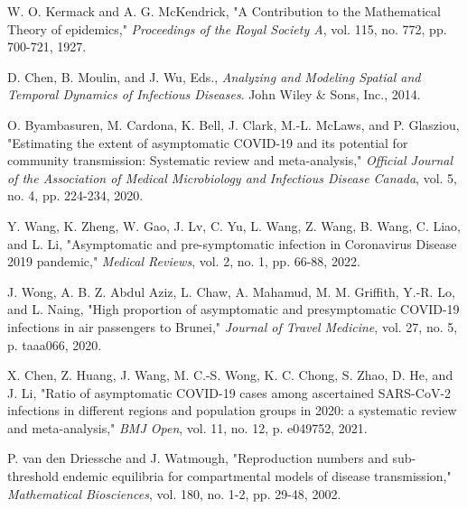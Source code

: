 \documentclass[12pt, a4paper]{article}
\begin{document}
\begin{thebibliography}{9}

    W. O. Kermack and A. G. McKendrick, 
    "A Contribution to the Mathematical Theory of epidemics,"
    \textit{Proceedings of the Royal Society A}, vol. 115, no. 772, pp. 700-721, 1927.

    D. Chen, B. Moulin, and J. Wu, Eds.,
    \textit{Analyzing and Modeling Spatial and Temporal Dynamics of Infectious Diseases}.
    John Wiley \& Sons, Inc., 2014.
    

    O. Byambasuren, M. Cardona, K. Bell, J. Clark, M.-L. McLaws, and P. Glasziou,
    "Estimating the extent of asymptomatic COVID-19 and its potential for community transmission: Systematic review and meta-analysis,"
    \textit{Official Journal of the Association of Medical Microbiology and Infectious Disease Canada}, vol. 5, no. 4, pp. 224-234, 2020.

    Y. Wang, K. Zheng, W. Gao, J. Lv, C. Yu, L. Wang, Z. Wang, B. Wang, C. Liao, and L. Li,
    "Asymptomatic and pre-symptomatic infection in Coronavirus Disease 2019 pandemic,"
    \textit{Medical Reviews}, vol. 2, no. 1, pp. 66-88, 2022.

    J. Wong, A. B. Z. Abdul Aziz, L. Chaw, A. Mahamud, M. M. Griffith, Y.-R. Lo, and L. Naing,
    "High proportion of asymptomatic and presymptomatic COVID-19 infections in air passengers to Brunei,"
    \textit{Journal of Travel Medicine}, vol. 27, no. 5, p. taaa066, 2020.

    X. Chen, Z. Huang, J. Wang, M. C.-S. Wong, K. C. Chong, S. Zhao, D. He, and J. Li,
    "Ratio of asymptomatic COVID-19 cases among ascertained SARS-CoV-2 infections in different regions and population groups in 2020: a systematic review and meta-analysis,"
    \textit{BMJ Open}, vol. 11, no. 12, p. e049752, 2021.

    P. van den Driessche and J. Watmough,
    "Reproduction numbers and sub-threshold endemic equilibria for compartmental models of disease transmission,"
    \textit{Mathematical Biosciences}, vol. 180, no. 1-2, pp. 29-48, 2002.
    
\end{thebibliography}
\end{document}
